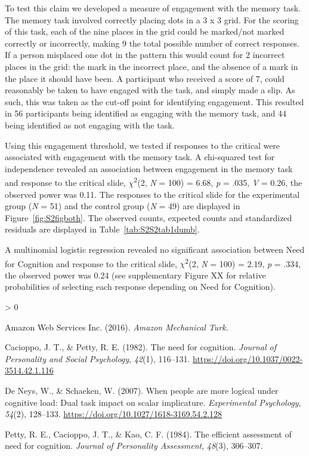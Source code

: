 \documentclass[
  american,
  man,floatsintext]{apa7}
\newlength{\cslhangindent}
\newenvironment{CSLReferences}[2] %
 {%
  \setlength{\parindent}{0pt}
  \ifodd #1 \everypar{\setlength{\hangindent}{\cslhangindent}}\ignorespaces\fi
  \ifnum #2 > 0
  \setlength{\parskip}{#2\baselineskip}
  \fi
 }%
 {}
\begin{document}
To test this claim we developed a measure of engagement with the memory task. The memory task involved correctly placing dots in a 3 x 3 grid. For the scoring of this task, each of the nine places in the grid could be marked/not marked correctly or incorrectly, making 9 the total possible number of correct responses. If a person misplaced one dot in the pattern this would count for 2 incorrect places in the grid: the mark in the incorrect place, and the absence of a mark in the place it should have been. A participant who received a score of 7, could reasonably be taken to have engaged with the task, and simply made a slip. As such, this was taken as the cut-off point for identifying engagement. This resulted in 56 participants being identified as engaging with the memory task, and 44 being identified as not engaging with the task.

Using this engagement threshold, we tested if responses to the critical were associated with engagement with the memory task. A chi-squared test for independence revealed an association between engagement in the memory task and response to the critical slide, \(\chi\)\textsuperscript{2}(2, \emph{N} = 100) = 6.68, \emph{p} = .035, \emph{V} = 0.26, the observed power was 0.11. The responses to the critical slide for the experimental group (\emph{N} = 51) and the control group (\emph{N} = 49) are displayed in Figure~\ref{fig:S2figboth}. The observed counts, expected counts and standardized residuals are displayed in Table~\ref{tab:S2S2tab1dumb}.

A multinomial logistic regression revealed no significant association between Need for Cognition and response to the critical slide, \(\chi\)\textsuperscript{2}(2, \emph{N} = 100) = 2.19, \emph{p} = .334, the observed power was 0.24 (see supplementary Figure XX for relative probabilities of selecting each response depending on Need for Cognition).

\hypertarget{refs}{}
\begin{CSLReferences}{1}{0}
\leavevmode\hypertarget{ref-amazonwebservicesinc._amazon_2016}{}%
Amazon Web Services Inc. (2016). \emph{Amazon {Mechanical Turk}}.

\leavevmode\hypertarget{ref-cacioppo_need_1982}{}%
Cacioppo, J. T., \& Petty, R. E. (1982). The need for cognition. \emph{Journal of Personality and Social Psychology}, \emph{42}(1), 116--131. \url{https://doi.org/10.1037/0022-3514.42.1.116}

\leavevmode\hypertarget{ref-deneys_when_2007}{}%
De Neys, W., \& Schaeken, W. (2007). When people are more logical under cognitive load: Dual task impact on scalar implicature. \emph{Experimental Psychology}, \emph{54}(2), 128--133. \url{https://doi.org/10.1027/1618-3169.54.2.128}

\leavevmode\hypertarget{ref-petty_efficient_1984}{}%
Petty, R. E., Cacioppo, J. T., \& Kao, C. F. (1984). The efficient assessment of need for cognition. \emph{Journal of Personality Assessment}, \emph{48}(3), 306--307.

\end{CSLReferences}
\end{document}
